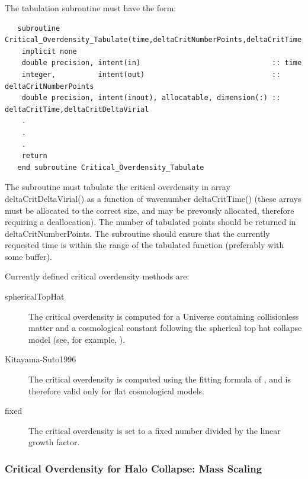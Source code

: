 The tabulation subroutine must have the form:
\begin{verbatim}
   subroutine Critical_Overdensity_Tabulate(time,deltaCritNumberPoints,deltaCritTime,deltaCritDeltaCrit)
    implicit none
    double precision, intent(in)                               :: time
    integer,          intent(out)                              :: deltaCritNumberPoints
    double precision, intent(inout), allocatable, dimension(:) :: deltaCritTime,deltaCritDeltaVirial
    .
    .
    .
    return
   end subroutine Critical_Overdensity_Tabulate
\end{verbatim}
The subroutine must tabulate the critical overdensity in array {\normalfont \ttfamily deltaCritDeltaVirial()} as a function of wavenumber {\normalfont \ttfamily deltaCritTime()} (these arrays must be allocated to the correct size, and may be prevously allocated, therefore requiring a deallocation). The number of tabulated points should be returned in {\normalfont \ttfamily deltaCritNumberPoints}. The subroutine should ensure that the currently requested {\normalfont \ttfamily time} is within the range of the tabulated function (preferably with some buffer).

Currently defined critical overdensity methods are:
\begin{description}
 \item [{\normalfont \ttfamily sphericalTopHat}] The critical overdensity is computed for a Universe containing collisionless matter and a cosmological constant following the spherical top hat collapse model (see, for example, \citealt{percival_cosmological_2005}).
 \item [{\normalfont \ttfamily Kitayama-Suto1996}] The critical overdensity is computed using the fitting formula of \cite{kitayama_semianalytic_1996}, and is therefore valid only for flat cosmological models.
 \item [{\normalfont \ttfamily fixed}] The critical overdensity is set to a fixed number divided by the linear growth factor.
\end{description}

\subsubsection{Critical Overdensity for Halo Collapse: Mass Scaling}

